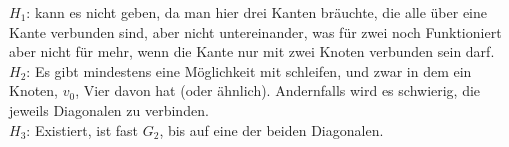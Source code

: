 \documentclass{scrartcl}
\begin{document}
$H_1$: kann es nicht geben, da man hier drei Kanten bräuchte, die alle über
eine Kante verbunden sind, aber nicht untereinander, was für zwei noch
Funktioniert aber nicht für mehr, wenn die Kante nur mit zwei Knoten verbunden
sein darf. \\
$H_2$: Es gibt mindestens eine Möglichkeit mit schleifen, und zwar in dem ein
Knoten, $v_0$, Vier davon hat (oder ähnlich). Andernfalls wird es schwierig,
die jeweils Diagonalen zu verbinden. \\
$H_3$: Existiert, ist fast $G_2$, bis auf eine der beiden Diagonalen.
\end{document}
